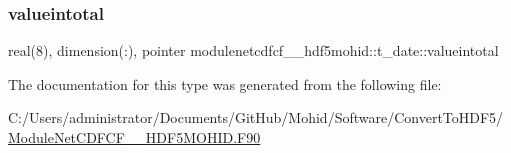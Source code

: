 \mbox{\label{structmodulenetcdfcf__2__hdf5mohid_1_1t__date_ac8f7a4000c39c91743f54b5059d693ea}} 
\subsubsection{\texorpdfstring{valueintotal}{valueintotal}}
{\footnotesize\ttfamily real(8), dimension(\+:), pointer modulenetcdfcf\+\_\+\_\+hdf5mohid\+::t\+\_\+date\+::valueintotal\hspace{0.3cm}{\ttfamily [private]}}



The documentation for this type was generated from the following file\+:\begin{DoxyCompactItemize}
\item 
C\+:/\+Users/administrator/\+Documents/\+Git\+Hub/\+Mohid/\+Software/\+Convert\+To\+H\+D\+F5/\mbox{\hyperlink{_module_net_c_d_f_c_f__2___h_d_f5_m_o_h_i_d_8_f90}{Module\+Net\+C\+D\+F\+C\+F\+\_\+\_\+\+H\+D\+F5\+M\+O\+H\+I\+D.\+F90}}\end{DoxyCompactItemize}
